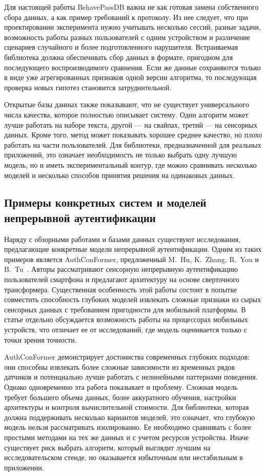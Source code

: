 \documentclass[oneside,senior,etd]{BYUPhys}
\begin{document}
Для настоящей работы BehavePassDB важна не как готовая замена собственного сбора данных, а как пример требований к протоколу. Из нее следует, что при проектировании эксперимента нужно учитывать несколько сессий, разные задачи, возможность работы разных пользователей с одним устройством и различение сценариев случайного и более подготовленного нарушителя. Встраиваемая библиотека должна обеспечивать сбор данных в формате, пригодном для последующего воспроизводимого сравнения. Если же данные сохраняются только в виде уже агрегированных признаков одной версии алгоритма, то последующая проверка новых гипотез становится затруднительной.

Открытые базы данных также показывают, что не существует универсального числа качества, которое полностью описывает систему. Один алгоритм может лучше работать на наборе текста, другой --- на свайпах, третий --- на сенсорных данных. Кроме того, метод может показывать хорошее среднее качество, но плохо работать на части пользователей. Для библиотеки, предназначенной для реальных приложений, это означает необходимость не только выбрать одну лучшую модель, но и иметь экспериментальный контур, где можно сравнивать несколько моделей и несколько способов принятия решения на одинаковых данных.

\subsection{Примеры конкретных систем и моделей непрерывной аутентификации}

Наряду с обзорными работами и базами данных существуют исследования, предлагающие конкретные модели непрерывной аутентификации. Одним из таких примеров является AuthConFormer, предложенный M.~Hu, K.~Zhang, R.~You и B.~Tu~\cite{hu2023authconformer}. Авторы рассматривают сенсорную непрерывную аутентификацию пользователей смартфона и предлагают архитектуру на основе сверточного трансформера. Существенная особенность этой работы состоит в попытке совместить способность глубоких моделей извлекать сложные признаки из сырых сенсорных данных с требованием пригодности для мобильной платформы. В статье отдельно обсуждается возможность работы на процессорах мобильных устройств, что отличает ее от исследований, где модель оценивается только с точки зрения точности.

AuthConFormer демонстрирует достоинства современных глубоких подходов: они способны извлекать более сложные зависимости из временных рядов датчиков и потенциально лучше работать с нелинейными паттернами поведения. Однако одновременно эта работа показывает и проблему. Сложная модель требует большего объема данных, более аккуратного обучения, настройки архитектуры и контроля вычислительной стоимости. Для библиотеки, которая должна поддерживать несколько вариантов моделей, это означает, что глубокую модель нельзя рассматривать изолированно. Ее необходимо сравнивать с более простыми методами на тех же данных и с учетом ресурсов устройства. Иначе существует риск выбрать алгоритм, который выглядит лучшим на исследовательском стенде, но оказывается избыточным или нестабильным в приложении.
\end{document}

